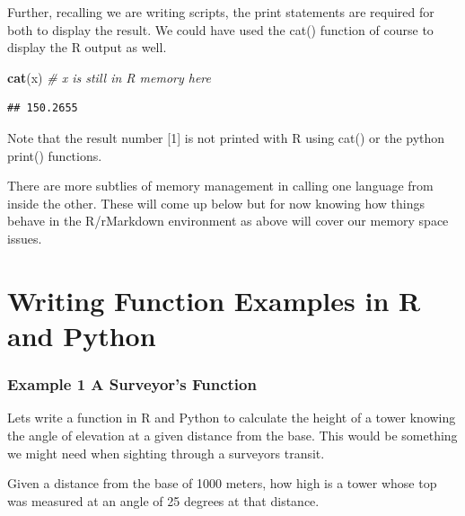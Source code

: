\documentclass[]{book}
\newenvironment{Shaded}{\begin{snugshade}}{\end{snugshade}}
\newcommand{\KeywordTok}[1]{\textcolor[rgb]{0.13,0.29,0.53}{\textbf{#1}}}
\newcommand{\CommentTok}[1]{\textcolor[rgb]{0.56,0.35,0.01}{\textit{#1}}}
\newcommand{\NormalTok}[1]{#1}
\theoremstyle{definition}
\theoremstyle{definition}
\theoremstyle{definition}
\theoremstyle{remark}
\begin{document}
Further, recalling we are writing scripts, the print statements are
required for both to display the result. We could have used the cat()
function of course to display the R output as well.

\begin{Shaded}
\begin{Highlighting}[]
\KeywordTok{cat}\NormalTok{(x)       }\CommentTok{# x is still in R memory here}
\end{Highlighting}
\end{Shaded}

\begin{verbatim}
## 150.2655
\end{verbatim}

Note that the result number {[}1{]} is not printed with R using cat() or
the python print() functions.

There are more subtlies of memory management in calling one language
from inside the other. These will come up below but for now knowing how
things behave in the R/rMarkdown environment as above will cover our
memory space issues.

\section{Writing Function Examples in R and
Python}\label{writing-function-examples-in-r-and-python}

\subsubsection{Example 1 A Surveyor's
Function}\label{example-1-a-surveyors-function}

Lets write a function in R and Python to calculate the height of a tower
knowing the angle of elevation at a given distance from the base. This
would be something we might need when sighting through a surveyors
transit.

Given a distance from the base of 1000 meters, how high is a tower whose
top was measured at an angle of 25 degrees at that distance.
\end{document}
